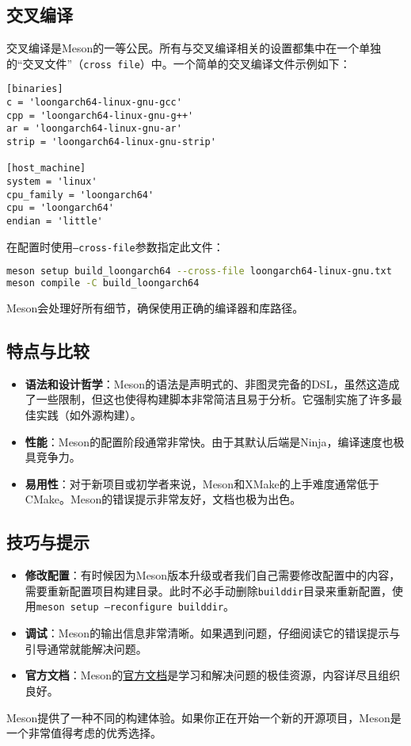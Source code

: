 \subsection{交叉编译}
交叉编译是Meson的一等公民。所有与交叉编译相关的设置都集中在一个单独的“交叉文件”（\texttt{cross file}）中。一个简单的交叉编译文件示例如下：
\begin{lstlisting}
[binaries]
c = 'loongarch64-linux-gnu-gcc'
cpp = 'loongarch64-linux-gnu-g++'
ar = 'loongarch64-linux-gnu-ar'
strip = 'loongarch64-linux-gnu-strip'

[host_machine]
system = 'linux'
cpu_family = 'loongarch64'
cpu = 'loongarch64'
endian = 'little'
\end{lstlisting}

在配置时使用\texttt{--cross-file}参数指定此文件：
\begin{lstlisting}[language=bash]
meson setup build_loongarch64 --cross-file loongarch64-linux-gnu.txt
meson compile -C build_loongarch64
\end{lstlisting}
Meson会处理好所有细节，确保使用正确的编译器和库路径。

\subsection{特点与比较}
\begin{itemize}
  \item \textbf{语法和设计哲学}：Meson的语法是声明式的、非图灵完备的DSL，虽然这造成了一些限制，但这也使得构建脚本非常简洁且易于分析。它强制实施了许多最佳实践（如外源构建）。
  \item \textbf{性能}：Meson的配置阶段通常非常快。由于其默认后端是Ninja，编译速度也极具竞争力。
  \item \textbf{易用性}：对于新项目或初学者来说，Meson和XMake的上手难度通常低于CMake。Meson的错误提示非常友好，文档也极为出色。
\end{itemize}

\subsection{技巧与提示}
\begin{itemize}
  \item \textbf{修改配置}：有时候因为Meson版本升级或者我们自己需要修改配置中的内容，需要重新配置项目构建目录。此时不必手动删除\texttt{builddir}目录来重新配置，使用\texttt{meson setup --reconfigure builddir}。
  \item \textbf{调试}：Meson的输出信息非常清晰。如果遇到问题，仔细阅读它的错误提示与引导通常就能解决问题。
  \item \textbf{官方文档}：Meson的\href{https://mesonbuild.com/}{官方文档}是学习和解决问题的极佳资源，内容详尽且组织良好。
\end{itemize}

Meson提供了一种不同的构建体验。如果你正在开始一个新的开源项目，Meson是一个非常值得考虑的优秀选择。
